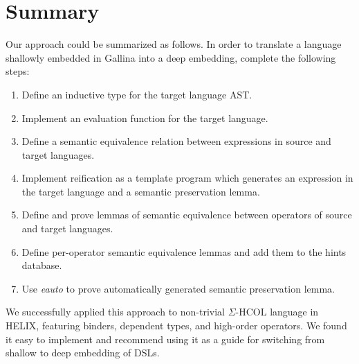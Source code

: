 \documentclass[sigplan]{acmart}\settopmatter{printfolios=true,printccs=false,printacmref=false}
\begin{document}
\section{Summary}

Our approach could be summarized as follows. In order to translate a
language shallowly embedded in Gallina into a deep embedding, complete
the following steps:

\begin{enumerate}
\item Define an inductive type for the target language AST.
\item Implement an evaluation function for the target language.
\item Define a semantic equivalence relation between expressions in
  source and target languages.
\item Implement reification as a template program which generates an
  expression in the target language and a semantic preservation lemma.
\item Define and prove lemmas of semantic equivalence between
  operators of source and target languages.
\item Define per-operator semantic equivalence lemmas and add them to the
  hints database.
\item Use \emph{eauto} to prove automatically generated semantic
  preservation lemma.  
\end{enumerate}

We successfully applied this approach to non-trivial $\Sigma$-HCOL language in
HELIX, featuring binders, dependent types, and high-order operators. We
found it easy to implement and recommend using it as a guide for
switching from shallow to deep embedding of DSLs.

\nocite{*}

\end{document}
